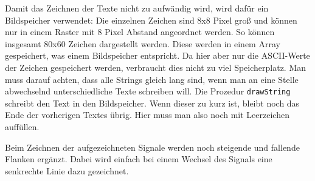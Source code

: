 \documentclass[IN,ngerman,utf8,12pt]{tumbook}
\begin{document}
Damit das Zeichnen der Texte nicht zu aufwändig wird, wird dafür ein Bildspeicher verwendet:
Die einzelnen Zeichen sind 8x8 Pixel groß und können nur in einem Raster mit 8 Pixel Abstand angeordnet werden.
So können insgesamt 80x60 Zeichen dargestellt werden.
Diese werden in einem Array gespeichert, was einem Bildspeicher entspricht.
Da hier aber nur die ASCII-Werte der Zeichen gespeichert werden, verbraucht dies nicht zu viel Speicherplatz.
Man muss darauf achten, dass alle Strings gleich lang sind, wenn man an eine Stelle abwechselnd unterschiedliche Texte schreiben will.
Die Prozedur \texttt{drawString} schreibt den Text in den Bildspeicher.
Wenn dieser zu kurz ist, bleibt noch das Ende der vorherigen Textes übrig.
Hier muss man also noch mit Leerzeichen auffüllen.

Beim Zeichnen der aufgezeichneten Signale werden noch steigende und fallende Flanken ergänzt.
Dabei wird einfach bei einem Wechsel des Signals eine senkrechte Linie dazu gezeichnet.
\end{document}
